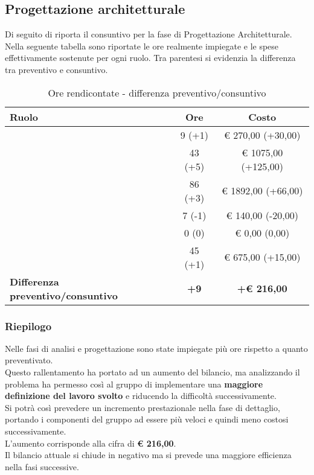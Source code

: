	\subsection{Progettazione architetturale} %
	\label{sub:progettazione_architetturale}
		Di seguito di riporta il consuntivo per la fase di Progettazione Architetturale.\\
		Nella seguente tabella sono riportate le ore realmente impiegate e le spese effettivamente sostenute per ogni ruolo. Tra parentesi si evidenzia la differenza tra preventivo e consuntivo.
		\begin{table}[!h]
			\begin{center}
				\begin{tabularx}{0.90\textwidth}{|X|c|c|}
					\hline
					\textbf{Ruolo} & \textbf{Ore} & \textbf{Costo} \\
					\hline
					\roleProjectManager & 9 (+1) & \euro{} 270,00 (+30,00) \\
					\hline
					\roleAnalyst & 43 (+5) &  \euro{} 1075,00 (+125,00) \\
					\hline
					\roleDesigner & 86 (+3) & \euro{} 1892,00 (+66,00) \\
					\hline
					\roleAdministrator & 7 (-1)  & \euro{} 140,00 (-20,00) \\
					\hline
					\roleProgrammer & 0 (0) & \euro{} 0,00 (0,00) \\
					\hline
					\roleVerifier & 45 (+1) & \euro{} 675,00 (+15,00) \\
					\hline
					\textbf{Differenza preventivo/consuntivo} & \textbf{+9} & \textbf{+\euro{} 216,00} \\
					\hline
				\end{tabularx}
			\end{center}
		\caption{Ore rendicontate - differenza preventivo/consuntivo}
		\end{table}


		\subsubsection{Riepilogo} %
		\label{ssub:riepilogo}
		Nelle fasi di analisi e progettazione sono state impiegate più ore rispetto a quanto preventivato.\\
		Questo rallentamento ha portato ad un aumento del bilancio, ma analizzando il problema ha permesso così al gruppo di implementare una \textbf{maggiore definizione del lavoro svolto} e riducendo la difficoltà successivamente.\\
		Si potrà così prevedere un incremento prestazionale nella fase di dettaglio, portando i componenti del gruppo ad essere più veloci e quindi meno costosi successivamente.\\
		L'aumento corrisponde alla cifra di \textbf{\euro{} 216,00}.\\
		Il bilancio attuale si chiude in negativo ma si prevede una maggiore efficienza nella fasi successive.

